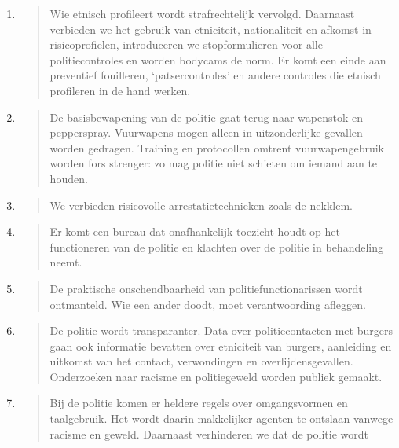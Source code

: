 \begin{enumerate}
\def\labelenumi{\arabic{enumi}.}
\item
  \begin{quote}
  Wie etnisch profileert wordt strafrechtelijk vervolgd. Daarnaast
  verbieden we het gebruik van etniciteit, nationaliteit en afkomst in
  risicoprofielen, introduceren we stopformulieren voor alle
  politiecontroles en worden bodycams de norm. Er komt een einde aan
  preventief fouilleren, `patsercontroles' en andere controles die
  etnisch profileren in de hand werken.
  \end{quote}
\item
  \begin{quote}
  De basisbewapening van de politie gaat terug naar wapenstok en
  pepperspray. Vuurwapens mogen alleen in uitzonderlijke gevallen worden
  gedragen. Training en protocollen omtrent vuurwapengebruik worden fors
  strenger: zo mag politie niet schieten om iemand aan te houden.
  \end{quote}
\item
  \begin{quote}
  We verbieden risicovolle arrestatietechnieken zoals de nekklem.
  \end{quote}
\item
  \begin{quote}
  Er komt een bureau dat onafhankelijk toezicht houdt op het
  functioneren van de politie en klachten over de politie in behandeling
  neemt.
  \end{quote}
\item
  \begin{quote}
  De praktische onschendbaarheid van politiefunctionarissen wordt
  ontmanteld. Wie een ander doodt, moet verantwoording afleggen.
  \end{quote}
\item
  \begin{quote}
  De politie wordt transparanter. Data over politiecontacten met burgers
  gaan ook informatie bevatten over etniciteit van burgers, aanleiding
  en uitkomst van het contact, verwondingen en overlijdensgevallen.
  Onderzoeken naar racisme en politiegeweld worden publiek gemaakt.
  \end{quote}
\item
  \begin{quote}
  Bij de politie komen er heldere regels over omgangsvormen en
  taalgebruik. Het wordt daarin makkelijker agenten te ontslaan vanwege
  racisme en geweld. Daarnaast verhinderen we dat de politie wordt

\end{quote}
\end{enumerate}
